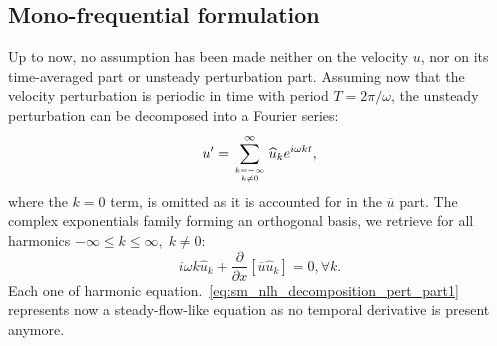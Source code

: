 \subsection{Mono-frequential formulation}
Up to now, no assumption has been made neither on the velocity $u$,
nor on its time-averaged part or unsteady perturbation part.
Assuming now that the velocity perturbation 
is periodic in time with period
$T=2 \pi / \omega$,
the unsteady perturbation can be decomposed into 
a Fourier series:
\begin{equation}
	u^\prime = \sum_{\genfrac{}{}{0pt}{}{k=-\infty}{k \neq 0}}^{\infty} 
	\widehat{u}_k e^{i \omega k t},
	\label{eq:sm_nlh_decomposition_pert}
\end{equation}
where the $k=0$ term, is omitted as it is accounted for in
the $\overline{u}$ part.
The complex exponentials family forming
an orthogonal basis, we retrieve for all harmonics 
$-\infty \leq k \leq \infty, \; k \neq 0$:
\begin{equation}
	i \omega k \widehat{u}_k + 
	\frac{\partial}{\partial x} \left[ \overline{u} \widehat{u}_k\right] =
	0, \forall k.
	\label{eq:sm_nlh_decomposition_pert_part1}
\end{equation}
Each one of harmonic equation.~\eqref{eq:sm_nlh_decomposition_pert_part1}
represents now a steady-flow-like equation as no temporal
derivative is present anymore.

